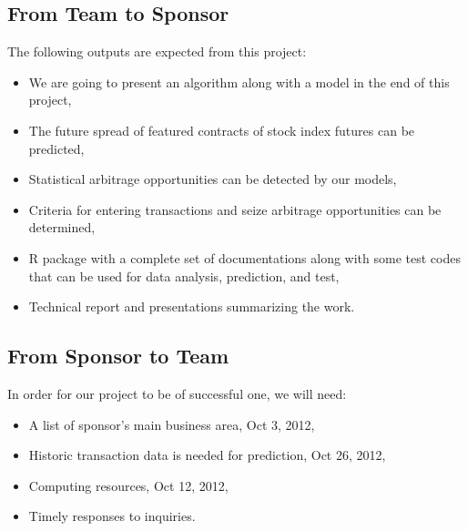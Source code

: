 \documentclass[12pt,letterpaper]{article}
\theoremstyle{definition}
\begin{document}
\subsection{From Team to Sponsor} %
The following outputs are expected from this project:
\begin{itemize}
   \item We are going to present an algorithm along with a model in the end of this project,
     \item The future spread of featured contracts of stock index futures can be predicted, 
    \item Statistical arbitrage opportunities can be detected by our models,
    \item Criteria for entering transactions and seize arbitrage opportunities can be determined,
    \item	R package with a complete set of documentations along with some test codes that can be used for data analysis, prediction, and test,
    \item Technical report and presentations summarizing the work.
\end{itemize}

\subsection{From Sponsor to Team} %

In order for our project to be of successful one, we will need:
\begin{itemize}
    \item A list of sponsor's main business area, Oct 3, 2012,
    \item Historic transaction data is needed for prediction, Oct 26, 2012,
    \item Computing resources, Oct 12, 2012,
    \item Timely responses to inquiries.
\end{itemize}


%
%
\end{document}
